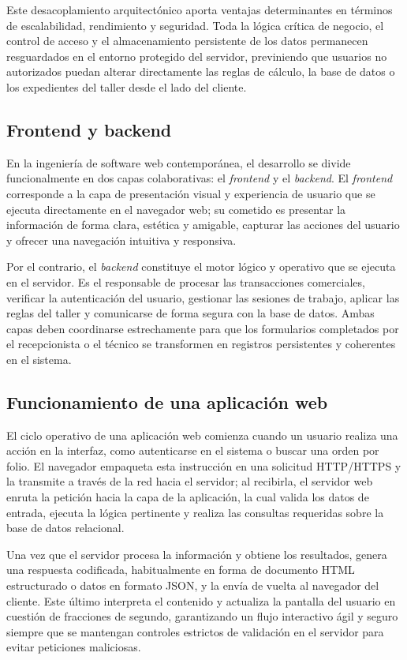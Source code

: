 Este desacoplamiento arquitectónico aporta ventajas determinantes en términos de escalabilidad, rendimiento y seguridad. Toda la lógica crítica de negocio, el control de acceso y el almacenamiento persistente de los datos permanecen resguardados en el entorno protegido del servidor, previniendo que usuarios no autorizados puedan alterar directamente las reglas de cálculo, la base de datos o los expedientes del taller desde el lado del cliente.

\subsection{Frontend y backend}

En la ingeniería de software web contemporánea, el desarrollo se divide funcionalmente en dos capas colaborativas: el \textit{frontend} y el \textit{backend}. El \textit{frontend} corresponde a la capa de presentación visual y experiencia de usuario que se ejecuta directamente en el navegador web; su cometido es presentar la información de forma clara, estética y amigable, capturar las acciones del usuario y ofrecer una navegación intuitiva y responsiva.

Por el contrario, el \textit{backend} constituye el motor lógico y operativo que se ejecuta en el servidor. Es el responsable de procesar las transacciones comerciales, verificar la autenticación del usuario, gestionar las sesiones de trabajo, aplicar las reglas del taller y comunicarse de forma segura con la base de datos. Ambas capas deben coordinarse estrechamente para que los formularios completados por el recepcionista o el técnico se transformen en registros persistentes y coherentes en el sistema.

\subsection{Funcionamiento de una aplicación web}

El ciclo operativo de una aplicación web comienza cuando un usuario realiza una acción en la interfaz, como autenticarse en el sistema o buscar una orden por folio. El navegador empaqueta esta instrucción en una solicitud HTTP/HTTPS y la transmite a través de la red hacia el servidor; al recibirla, el servidor web enruta la petición hacia la capa de la aplicación, la cual valida los datos de entrada, ejecuta la lógica pertinente y realiza las consultas requeridas sobre la base de datos relacional.

Una vez que el servidor procesa la información y obtiene los resultados, genera una respuesta codificada, habitualmente en forma de documento HTML estructurado o datos en formato JSON, y la envía de vuelta al navegador del cliente. Este último interpreta el contenido y actualiza la pantalla del usuario en cuestión de fracciones de segundo, garantizando un flujo interactivo ágil y seguro siempre que se mantengan controles estrictos de validación en el servidor para evitar peticiones maliciosas.

